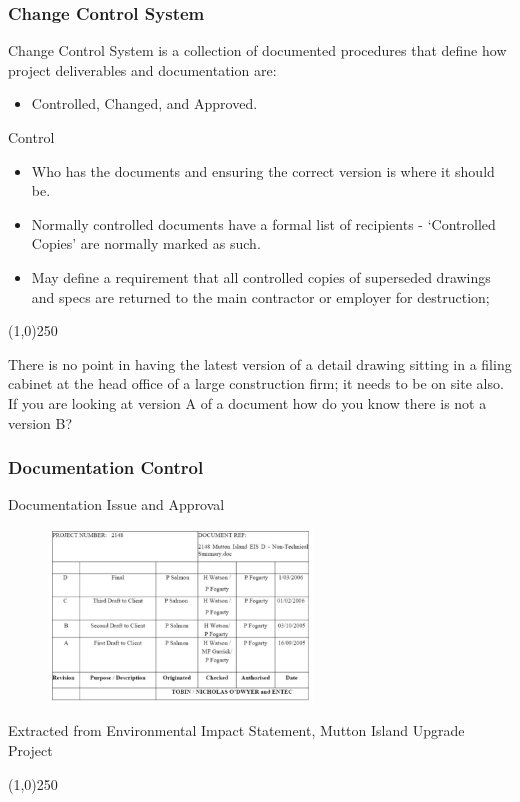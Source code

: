\begin{frame}
\frametitle{Change Control System}
Change Control System is a collection of documented procedures that define how project deliverables and documentation are:
\begin{itemize}
	\item Controlled, Changed, and Approved.
\end{itemize}
Control 
\begin{itemize}
	\item Who has the documents and ensuring the correct version is where it should be.
	\item Normally controlled documents have a formal list of recipients - `Controlled Copies' are normally marked as such. 
	\item May define a requirement that all controlled copies of superseded drawings and specs are returned to the main contractor or employer for destruction;  
\end{itemize}
\end{frame}\begin{center}\line(1,0){250}\end{center}
There is no point in having the latest version of a detail drawing sitting in a filing cabinet at the head office of a large construction firm; it needs to be on site also. If you are looking at version A of a document how do you know there is not a version B?
%





\begin{frame}
\frametitle{Documentation Control}
Documentation Issue and Approval
\begin{figure}
	\centering
		\includegraphics[width = 7cm]{images/doccontrol.jpg}
	\label{fig:doccontrol}
\end{figure}Extracted from Environmental Impact Statement,  Mutton Island Upgrade Project 
\end{frame}\begin{center}\line(1,0){250}\end{center}
%
%
%

